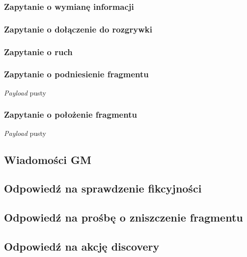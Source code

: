 \documentclass[Dokumentacja.tex]{subfiles}
\begin{document}
\subsubsection{Zapytanie o wymianę informacji}


\subsubsection{Zapytanie o dołączenie do rozgrywki}


\subsubsection{Zapytanie o ruch}


\subsubsection{Zapytanie o podniesienie fragmentu}
\textit{Payload} pusty


\subsubsection{Zapytanie o położenie fragmentu}
\textit{Payload} pusty



\subsection{Wiadomości GM}
\subsection{Odpowiedź na sprawdzenie fikcyjności}


\subsection{Odpowiedź na prośbę o zniszczenie fragmentu}


\subsection{Odpowiedź na akcję discovery}

\end{document}
